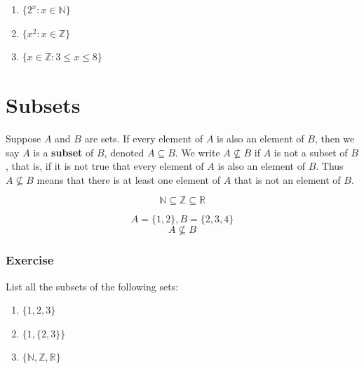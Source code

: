 \documentclass[
  letterpaper,
  DIV=11,
  numbers=noendperiod]{scrreprt}
\providecommand{\tightlist}{%
  \setlength{\itemsep}{0pt}\setlength{\parskip}{0pt}}\usepackage{longtable,booktabs,array}
\begin{document}
\begin{tcolorbox}[enhanced jigsaw, opacityback=0, left=2mm, breakable, bottomtitle=1mm, rightrule=.15mm, colframe=quarto-callout-tip-color-frame, titlerule=0mm, colback=white, opacitybacktitle=0.6, toptitle=1mm, title=\textcolor{quarto-callout-tip-color}{\faLightbulb}\hspace{0.5em}{Solution}, colbacktitle=quarto-callout-tip-color!10!white, bottomrule=.15mm, arc=.35mm, coltitle=black, leftrule=.75mm, toprule=.15mm]

\begin{enumerate}
\def\labelenumi{\arabic{enumi}.}
\tightlist
\item
  \(\{ 2^x: x \in \mathbb{N} \}\)
\item
  \(\{ x^2: x \in \mathbb{Z} \}\)
\item
  \(\{ x \in \mathbb{Z}: 3 \le x \le 8 \}\)
\end{enumerate}

\end{tcolorbox}

\section{Subsets}\label{subsets}

Suppose \(A\) and \(B\) are sets. If every element of \(A\) is also an
element of \(B\), then we say \(A\) is a \textbf{subset} of \(B\),
denoted \(A \subseteq B\). We write \(A \not\subseteq B\) if \(A\) is
not a subset of \(B\), that is, if it is not true that every element of
\(A\) is also an element of \(B\). Thus \(A \not\subseteq B\) means that
there is at least one element of \(A\) that is not an element of \(B\).

\[
\mathbb{N} \subseteq \mathbb{Z} \subseteq \mathbb{R}
\]

\[
A = \{1,2\}, B = \{2,3,4\}
\] \[
A \not\subseteq B
\]

\subsubsection{Exercise}\label{exercise-1}

List all the subsets of the following sets:

\begin{enumerate}
\def\labelenumi{\arabic{enumi}.}
\tightlist
\item
  \(\{1,2,3\}\)
\item
  \(\{1,\{2,3\}\}\)
\item
  \(\{\mathbb{N}, \mathbb{Z}, \mathbb{R}\}\)
\end{enumerate}
\end{document}

